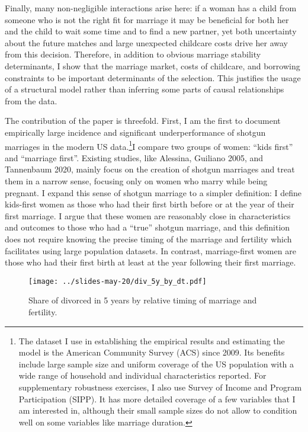 \documentclass[12pt,letter]{article}
\begin{document}
Finally, many non-negligible interactions arise here: if a woman has a child from someone who is not the right fit for marriage it may be beneficial for both her and the child to wait some time and to find a new partner, yet both uncertainty about the future matches and large unexpected childcare costs drive her away from this decision. Therefore, in addition to obvious marriage stability determinants, I show that the marriage market, costs of childcare, and borrowing constraints to be important determinants of the selection. This justifies the usage of a structural model rather than inferring some parts of causal relationships from the data.

\newcommand{\fn}{\footnote{The dataset I use in establishing the empirical results and estimating the model is the American Community Survey (ACS) since 2009. Its benefits include large sample size and uniform coverage of the US population with a wide range of household and individual characteristics reported. For supplementary robustness exercises, I also use Survey of Income and Program Participation (SIPP). It has more detailed coverage of a few variables that I am interested in, although their small sample sizes do not allow to condition well on some variables like marriage duration.}}

The contribution of the paper is threefold. First, I am the first to document empirically large incidence and significant underperformance of shotgun marriages in the modern US data.\fn I compare two groups of women: ``kids first'' and ``marriage first''. Existing studies, like Alessina, Guiliano 2005, and Tannenbaum 2020, mainly focus on the creation of shotgun marriages and treat them in a narrow sense, focusing only on women who marry while being pregnant. I expand this sense of shotgun marriage to a simpler definition: I define kids-first women as those who had their first birth before or at the year of their first marriage. I argue that these women are reasonably close in characteristics and outcomes to those who had a ``true'' shotgun marriage, and this definition does not require knowing the precise timing of the marriage and fertility which facilitates using large population datasets. In contrast, marriage-first women are those who had their first birth at least at the year following their first marriage.

\begin{figure}[h!]
\begin{center}
\texttt{[image: ../slides-may-20/div\_5y\_by\_dt.pdf]}
\caption{Share of divorced in 5 years by relative timing of marriage and fertility.\label{fig1}}
\end{center}
\end{figure}
\end{document}
